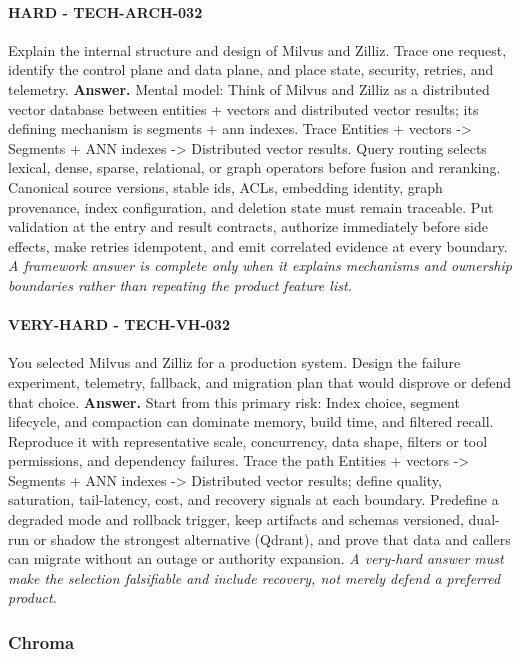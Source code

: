 \paragraph{HARD - TECH-ARCH-032} Explain the internal structure and design of Milvus and Zilliz. Trace one request, identify the control plane and data plane, and place state, security, retries, and telemetry.
\textbf{Answer.} Mental model: Think of Milvus and Zilliz as a distributed vector database between entities + vectors and distributed vector results; its defining mechanism is segments + ann indexes. Trace Entities + vectors -> Segments + ANN indexes -> Distributed vector results. Query routing selects lexical, dense, sparse, relational, or graph operators before fusion and reranking. Canonical source versions, stable ids, ACLs, embedding identity, graph provenance, index configuration, and deletion state must remain traceable. Put validation at the entry and result contracts, authorize immediately before side effects, make retries idempotent, and emit correlated evidence at every boundary.
\textit{A framework answer is complete only when it explains mechanisms and ownership boundaries rather than repeating the product feature list.}
\paragraph{VERY-HARD - TECH-VH-032} You selected Milvus and Zilliz for a production system. Design the failure experiment, telemetry, fallback, and migration plan that would disprove or defend that choice.
\textbf{Answer.} Start from this primary risk: Index choice, segment lifecycle, and compaction can dominate memory, build time, and filtered recall. Reproduce it with representative scale, concurrency, data shape, filters or tool permissions, and dependency failures. Trace the path Entities + vectors -> Segments + ANN indexes -> Distributed vector results; define quality, saturation, tail-latency, cost, and recovery signals at each boundary. Predefine a degraded mode and rollback trigger, keep artifacts and schemas versioned, dual-run or shadow the strongest alternative (Qdrant), and prove that data and callers can migrate without an outage or authority expansion.
\textit{A very-hard answer must make the selection falsifiable and include recovery, not merely defend a preferred product.}
\subsubsection*{Chroma}
